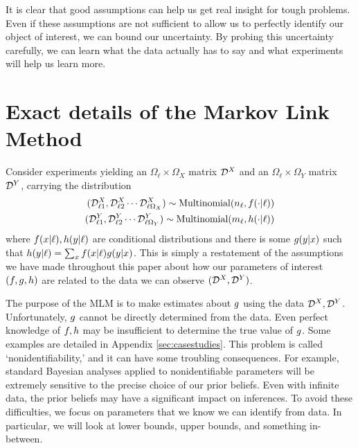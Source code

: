 It is clear that good assumptions can help us get real insight for tough problems. Even if these assumptions are not sufficient to allow us to perfectly identify our object of interest, we can bound our uncertainty.  By probing this uncertainty carefully, we can learn what the data actually has to say and what experiments will help us learn more.




\appendix


%

\section{Exact details of the Markov Link Method}

\label{sec:mlmdetails}
 
Consider experiments yielding an $\Omega_\ell\times\Omega_X$ matrix $\mathcal{D}^X$ and an $\Omega_\ell \times \Omega_Y$ matrix $\mathcal{D}^Y$, carrying the distribution
\begin{align*}
(\mathcal{D}^X_{\ell 1},\mathcal{D}^X_{\ell 2}\cdots \mathcal{D}^X_{\ell \Omega_X}) \sim \mathrm{Multinomial}(n_\ell,f(\cdot | \ell))\\
(\mathcal{D}^Y_{\ell 1},\mathcal{D}^Y_{\ell 2}\cdots \mathcal{D}^Y_{\ell \Omega_Y}) \sim \mathrm{Multinomial}(m_\ell,h(\cdot | \ell))
\end{align*}
where $f(x|\ell),h(y|\ell)$ are conditional distributions and there is some $g(y|x)$ such that $h(y|\ell)=\sum_x f(x|\ell)g(y|x)$.  This is simply a restatement of the assumptions we have made throughout this paper about how our parameters of interest $(f,g,h)$ are related to the data we can observe $(\mathcal{D}^X,\mathcal{D}^Y)$.

The purpose of the MLM is to make estimates about $g$ using the data $\mathcal{D}^X,\mathcal{D}^Y$.  Unfortunately, $g$ cannot be directly determined from the data.  Even perfect knowledge of $f,h$ may be insufficient to determine the true value of $g$.  Some examples are detailed in Appendix \ref{sec:casestudies}.  This problem is called `nonidentifiability,' and it can have some troubling consequences.  For example, standard Bayesian analyses applied to nonidentifiable parameters will be extremely sensitive to the precise choice of our prior beliefs.  Even with infinite data, the prior beliefs may have a significant impact on inferences.  To avoid these difficulties, we focus on parameters that we know we can identify from data.  In particular, we will look at lower bounds, upper bounds, and something in-between.

